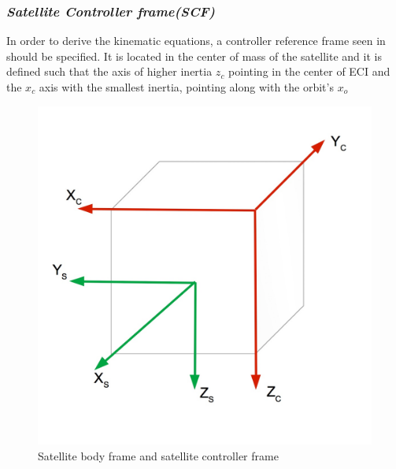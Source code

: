 \subsubsection{\textit{Satellite Controller frame(SCF)}}
In order to derive the kinematic equations, a controller reference frame seen in  should be specified. It is located in the center of mass of the satellite and it is defined such that the axis of higher inertia $z_{c}$ pointing in the center of ECI and the $x_{c}$ axis with the smallest inertia, pointing along with  the orbit's $x_{o}$ 
\begin{figure}[H]
	\centering
	\includegraphics[width=0.4\linewidth]{figures/frames}
	\caption{Satellite body frame and satellite controller frame}
	\label{fig:frames}
\end{figure}

